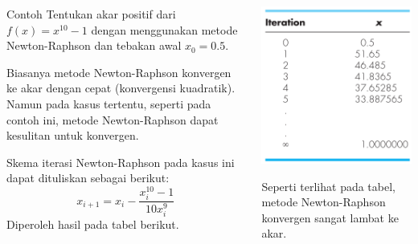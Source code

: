 \begin{frame}
\fontsize{9}{10}\selectfont

\begin{columns}
  \begin{column}{0.5\textwidth}
  \begin{block}{Contoh}
  Tentukan akar positif dari $f(x) = x^{10} - 1$ dengan menggunakan metode Newton-Raphson
  dan tebakan awal $x_0 = 0.5$.
  \end{block}
  Biasanya metode Newton-Raphson konvergen ke akar dengan cepat (konvergensi kuadratik).
  Namun pada kasus tertentu, seperti pada contoh ini,
  metode Newton-Raphson dapat kesulitan untuk konvergen.
  
  Skema iterasi Newton-Raphson pada kasus ini dapat dituliskan sebagai berikut:
  $$
  x_{i+1} = x_{i} - \frac{x_{i}^{10} - 1}{10x_{i}^{9}}
  $$
  Diperoleh hasil pada tabel berikut.
  \end{column}

  \begin{column}{0.5\textwidth}
  
  {\centering
  \includegraphics[height=0.5\textheight]{../chapra_7th/Chapra_Table_Example_6_5.png}
  \par}

  Seperti terlihat pada tabel, metode Newton-Raphson konvergen sangat lambat ke
  akar.


\end{column}
\end{columns}
\end{frame}
